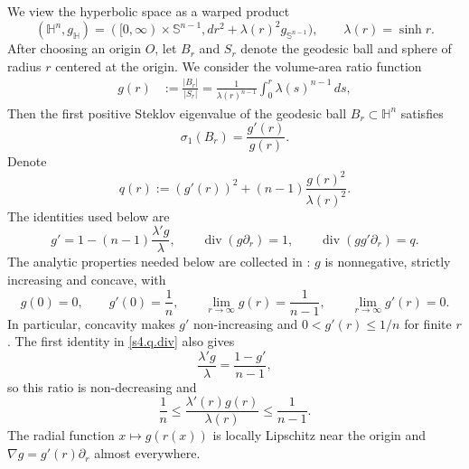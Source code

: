\documentclass[10pt,a4paper]{amsart}
\numberwithin{equation}{section}
\newcommand{\Sn}{\mathbb S}
\newcommand{\diver}{\operatorname{div}}
\newcommand{\HH}{\mathbb H}
\begin{document}
We view the hyperbolic space as a warped product
\begin{equation*}
    (\HH^n,g_{\HH})=([0,\infty)\times\Sn^{n-1},dr^2+\lambda(r)^2g_{\Sn^{n-1}}),
    \qquad
    \lambda(r)=\sinh r.
\end{equation*}
After choosing an origin $O$, let $B_r$ and $S_r$ denote the geodesic ball and sphere of radius $r$ centered at the origin. We consider the volume-area ratio function 
\begin{align*}
    g(r)&:=\frac{|B_r|}{|S_r|}=\frac{1}{\lambda(r)^{n-1}}\int_0^r\lambda(s)^{n-1}\,ds,
\end{align*}
Then the first positive Steklov eigenvalue of the geodesic ball $B_r\subset \mathbb{H}^n$ satisfies 
\begin{equation*}
    \sigma_1(B_r)=\frac{g'(r)}{g(r)}. 
\end{equation*}
Denote 
\begin{equation}\label{s4.q}
    q(r):=(g'(r))^2+(n-1)\frac{g(r)^2}{\lambda(r)^2}.
\end{equation}
The identities used below are
\begin{equation}\label{s4.q.div}
    g'=1-(n-1)\frac{\lambda'g}{\lambda},
    \qquad
    \diver(g\partial_r)=1,
    \qquad
    \diver(gg'\partial_r)=q.
\end{equation}
The analytic properties needed below are collected in
\cite[Propositions~3.4 and~3.5]{GuLiWan2025}: $g$ is nonnegative,
strictly increasing and concave, with
\begin{equation*}
    g(0)=0,
    \qquad g'(0)=\frac1n,
    \qquad \lim_{r\to\infty}g(r)=\frac1{n-1},
    \qquad \lim_{r\to\infty}g'(r)=0.
\end{equation*}
In particular, concavity makes $g'$ non-increasing and
$0<g'(r)\leq1/n$ for finite $r$.  The first identity in
\eqref{s4.q.div} also gives
\begin{equation*}
    \frac{\lambda'g}{\lambda}=\frac{1-g'}{n-1},
\end{equation*}
so this ratio is non-decreasing and
\begin{equation}\label{eq:hyp-a-range}
    \frac1n\leq \frac{\lambda'(r)g(r)}{\lambda(r)} \leq\frac1{n-1}.
\end{equation}
The radial function $x\mapsto g(r(x))$ is locally Lipschitz near the origin and $ \nabla g=g'(r)\partial_r$ 
almost everywhere.
\end{document}
